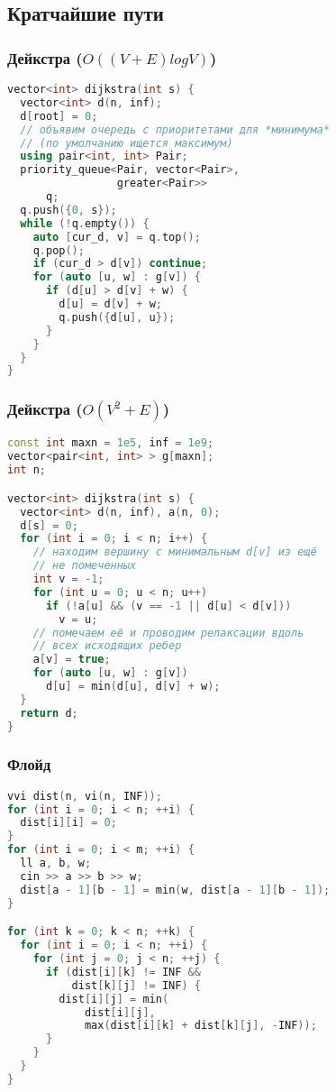 \documentclass[10pt,a4paper,landscape,twosided]{extarticle}
\begin{document}
\begin{multicols}{3}
\subsection{Кратчайшие пути}

\subsubsection{Дейкстра ($O((V+E)logV)$)}
\begin{lstlisting}[language=C++]
vector<int> dijkstra(int s) {
  vector<int> d(n, inf);
  d[root] = 0;
  // объявим очередь с приоритетами для *минимума*
  // (по умолчанию ищется максимум)
  using pair<int, int> Pair;
  priority_queue<Pair, vector<Pair>,
                 greater<Pair>>
      q;
  q.push({0, s});
  while (!q.empty()) {
    auto [cur_d, v] = q.top();
    q.pop();
    if (cur_d > d[v]) continue;
    for (auto [u, w] : g[v]) {
      if (d[u] > d[v] + w) {
        d[u] = d[v] + w;
        q.push({d[u], u});
      }
    }
  }
}
\end{lstlisting}

\subsubsection{Дейкстра ($O(V^2+E)$)}
\begin{lstlisting}[language=C++]
const int maxn = 1e5, inf = 1e9;
vector<pair<int, int> > g[maxn];
int n;

vector<int> dijkstra(int s) {
  vector<int> d(n, inf), a(n, 0);
  d[s] = 0;
  for (int i = 0; i < n; i++) {
    // находим вершину с минимальным d[v] из ещё
    // не помеченных
    int v = -1;
    for (int u = 0; u < n; u++)
      if (!a[u] && (v == -1 || d[u] < d[v]))
        v = u;
    // помечаем её и проводим релаксации вдоль
    // всех исходящих ребер
    a[v] = true;
    for (auto [u, w] : g[v])
      d[u] = min(d[u], d[v] + w);
  }
  return d;
}
\end{lstlisting}

\subsubsection{Флойд}
\begin{lstlisting}[language=C++]
vvi dist(n, vi(n, INF));
for (int i = 0; i < n; ++i) {
  dist[i][i] = 0;
}
for (int i = 0; i < m; ++i) {
  ll a, b, w;
  cin >> a >> b >> w;
  dist[a - 1][b - 1] = min(w, dist[a - 1][b - 1]);
}

for (int k = 0; k < n; ++k) {
  for (int i = 0; i < n; ++i) {
    for (int j = 0; j < n; ++j) {
      if (dist[i][k] != INF &&
          dist[k][j] != INF) {
        dist[i][j] = min(
            dist[i][j],
            max(dist[i][k] + dist[k][j], -INF));
      }
    }
  }
}
\end{lstlisting}


\end{multicols}
\end{document}
